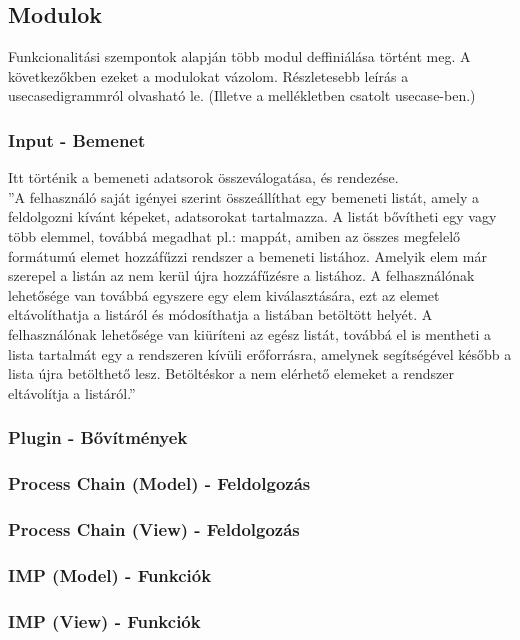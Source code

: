 \documentclass[a4paper,12pt,oneside]{report}
\begin{document}
\subsection{Modulok}
Funkcionalitási szempontok alapján több modul deffiniálása történt meg. A következőkben ezeket a modulokat vázolom. Részletesebb leírás a usecasedigrammról olvasható le. (Illetve a mellékletben csatolt usecase-ben.)

\subsubsection{Input - Bemenet}
Itt történik a bemeneti adatsorok összeválogatása, és rendezése.\\
''A felhasználó saját igényei szerint összeállíthat egy bemeneti listát, amely a feldolgozni kívánt képeket, adatsorokat tartalmazza. A listát bővítheti egy vagy több elemmel, továbbá megadhat pl.: mappát, amiben az összes megfelelő formátumú elemet hozzáfűzzi rendszer a bemeneti listához. Amelyik elem már szerepel a listán az nem kerül újra hozzáfűzésre a listához. A felhasználónak lehetősége van továbbá egyszere egy elem kiválasztására, ezt az elemet eltávolíthatja a listáról és módosíthatja a listában betöltött helyét. A felhasználónak lehetősége van kiüríteni az egész listát, továbbá el is mentheti a lista tartalmát egy a rendszeren kívüli erőforrásra, amelynek segítségével később a lista újra betölthető lesz. Betöltéskor a nem elérhető elemeket a rendszer eltávolítja a listáról.''
\subsubsection{Plugin - Bővítmények}

\subsubsection{Process Chain (Model) - Feldolgozás}

\subsubsection{Process Chain (View) - Feldolgozás}

\subsubsection{IMP (Model) - Funkciók}


\subsubsection{IMP (View) - Funkciók}
\end{document}
